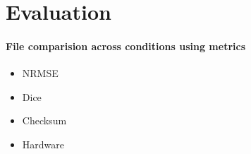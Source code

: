 \section{Evaluation}
\paragraph{File comparision across conditions using metrics}
\begin{itemize}
  \item NRMSE
  \item Dice
  \item Checksum
  \item Hardware
\end{itemize}
